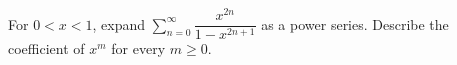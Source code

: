 For $0<x<1$, expand $\sum_{n=0}^\infty\dfrac{x^{2n}}{1-x^{2n+1}}$ as a power series. Describe the coefficient of $x^m$ for every $m\ge0$.
